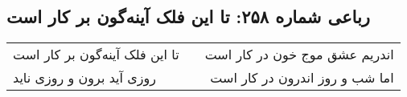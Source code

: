 \begin{center}
\section*{رباعی شماره ۲۵۸: تا این فلک آینه‌گون بر کار است}
\label{sec:0258}
\begin{longtable}{l p{0.5cm} r}
تا این فلک آینه‌گون بر کار است
&&
اندریم عشق موج خون در کار است
\\
روزی آید برون و روزی ناید
&&
اما شب و روز اندرون در کار است
\\
\end{longtable}
\end{center}
